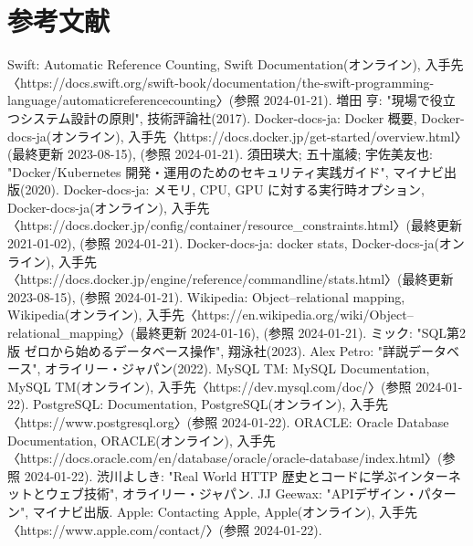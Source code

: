 \documentclass[../../main]{subfiles}
\begin{document}
    \section{参考文献}\label{sec:reference}

    \begin{thebibliography}{99}
         Swift: Automatic Reference Counting, Swift Documentation(オンライン), 入手先〈https://docs.swift.org/swift-book/documentation/the-swift-programming-language/automaticreferencecounting〉(参照 2024-01-21).
         増田 亨: "現場で役立つシステム設計の原則", 技術評論社(2017).
         Docker-docs-ja: Docker 概要, Docker-docs-ja(オンライン), 入手先〈https://docs.docker.jp/get-started/overview.html〉(最終更新 2023-08-15), (参照 2024-01-21).
         須田瑛大; 五十嵐綾; 宇佐美友也: "Docker/Kubernetes 開発・運用のためのセキュリティ実践ガイド", マイナビ出版(2020).
         Docker-docs-ja: メモリ, CPU, GPU に対する実行時オプション, Docker-docs-ja(オンライン), 入手先〈https://docs.docker.jp/config/container/resource_constraints.html〉(最終更新 2021-01-02), (参照 2024-01-21).
         Docker-docs-ja: docker stats, Docker-docs-ja(オンライン), 入手先〈https://docs.docker.jp/engine/reference/commandline/stats.html〉(最終更新 2023-08-15), (参照 2024-01-21).
         Wikipedia: Object–relational mapping, Wikipedia(オンライン), 入手先〈https://en.wikipedia.org/wiki/Object–relational_mapping〉(最終更新 2024-01-16), (参照 2024-01-21).
         ミック: "SQL第2版 ゼロから始めるデータベース操作", 翔泳社(2023).
         Alex Petro: "詳説データベース", オライリー・ジャパン(2022).
         MySQL TM: MySQL Documentation, MySQL TM(オンライン), 入手先〈https://dev.mysql.com/doc/〉(参照 2024-01-22).
         PostgreSQL: Documentation, PostgreSQL(オンライン), 入手先〈https://www.postgresql.org〉(参照 2024-01-22).
         ORACLE: Oracle Database Documentation, ORACLE(オンライン), 入手先〈https://docs.oracle.com/en/database/oracle/oracle-database/index.html〉(参照 2024-01-22).
         渋川よしき: "Real World HTTP 歴史とコードに学ぶインターネットとウェブ技術", オライリー・ジャパン.
         JJ Geewax: "APIデザイン・パターン", マイナビ出版.
         Apple: Contacting Apple, Apple(オンライン), 入手先〈https://www.apple.com/contact/〉(参照 2024-01-22).

\end{thebibliography}
\end{document}

